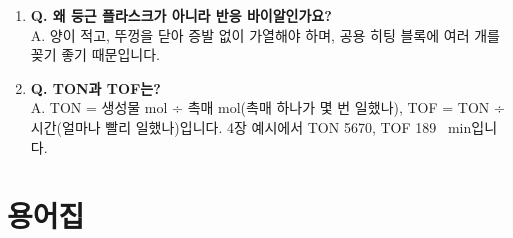 \documentclass[10pt,a4paper]{article}
\begin{document}
\begin{enumerate}[leftmargin=6mm,itemsep=1.2mm]
\item \textbf{Q. 왜 둥근 플라스크가 아니라 반응 바이알인가요?}\\ A. 양이 적고, 뚜껑을 닫아 증발 없이 가열해야 하며, 공용 히팅 블록에 여러 개를 꽂기 좋기 때문입니다.
\item \textbf{Q. TON과 TOF는?}\\ A. TON = 생성물 mol ÷ 촉매 mol(촉매 하나가 몇 번 일했나), TOF = TON ÷ 시간(얼마나 빨리 일했나)입니다. 4장 예시에서 TON 5670, TOF 189 \si{\per\minute}입니다.
\end{enumerate}

\section*{용어집}
\renewcommand{\arraystretch}{1.2}
\end{document}
